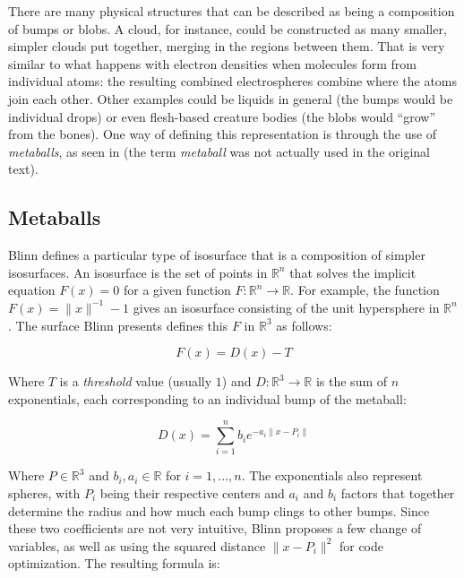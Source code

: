 \documentclass[conference]{acmsiggraph}
\begin{document}
There are many physical structures that can be described as being a composition
of bumps or blobs. A cloud, for instance, could be constructed as many smaller,
simpler clouds put together, merging in the regions between them. That is very
similar to what happens with electron densities when molecules form from
individual atoms: the resulting combined electrospheres combine where the atoms
join each other. Other examples could be liquids in general (the bumps would be
individual drops) or even flesh-based creature bodies (the blobs would ``grow''
from the bones). One way of defining this representation is through the use of
\textit{metaballs}, as seen in \cite{Blinn:1982:GAS:965145.801290} (the term
\textit{metaball} was not actually used in the original text).

\subsection{Metaballs}

Blinn  defines a particular type of
isosurface that is a composition of simpler isosurfaces. An isosurface is the
set of points in $\mathbb{R}^n$ that solves the implicit equation
$F(x) = 0$ for a given function $F:\mathbb{R}^n \rightarrow \mathbb{R}$. For
example, the function $F(x) = \|x\|^{-1} - 1$ gives an isosurface
consisting of the unit hypersphere in $\mathbb{R}^n$. The surface Blinn presents
defines this $F$ in $\mathbb{R}^3$ as follows:

\begin{equation}
  F(x) = D(x) - T
\end{equation}

Where $T$ is a \textit{threshold} value (usually $1$) and
$D:\mathbb{R}^3 \rightarrow \mathbb{R}$ is the sum of $n$ exponentials, each
corresponding to an individual bump of the metaball:

\begin{equation}
  D(x) = \sum_{i=1}^{n} b_i e^{-a_i \|x-P_i\|}
\end{equation}

Where $P\in\mathbb{R}^3$ and $b_i,a_i\in\mathbb{R}$ for $i=1,...,n$. The
exponentials also represent spheres, with $P_i$ being their respective centers
and $a_i$ and $b_i$ factors that together determine the radius and how much each
bump clings to other bumps. Since these two coefficients are not very intuitive,
Blinn proposes a few change of variables, as well as using the squared distance
$\|x-P_i\|^2$ for code optimization. The resulting formula is:
\end{document}
